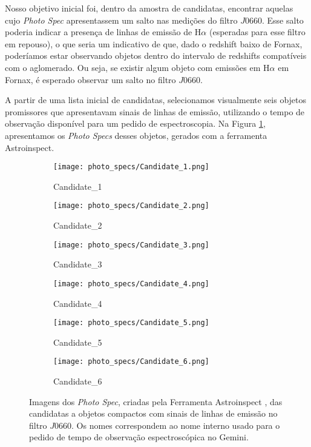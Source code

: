 Nosso objetivo inicial foi, dentro da amostra de candidatas, encontrar aquelas cujo \textit{Photo Spec} apresentassem um salto nas medições do filtro $J0660$. Esse salto poderia indicar a presença de linhas de emissão de H$\alpha$ (esperadas para esse filtro em repouso), o que seria um indicativo de que, dado o redshift baixo de Fornax, poderíamos estar observando objetos dentro do intervalo de redshifts compatíveis com o aglomerado. Ou seja, se existir algum objeto com emissões em H$\alpha$ em Fornax, é esperado observar um salto no filtro $J0660$.

A partir de uma lista inicial de candidatas, selecionamos visualmente seis objetos promissores que apresentavam sinais de linhas de emissão, utilizando o tempo de observação disponível para um pedido de espectroscopia. Na Figura \ref{photo_spec_candidatas}, apresentamos os \textit{Photo Specs} desses objetos, gerados com a ferramenta Astroinspect.

\begin{figure}[!ht]
    \centering
    \captionsetup{justification=centering}
    \begin{subfigure}[b]{0.3\textwidth}
        \texttt{[image: photo\_specs/Candidate\_1.png]}
        \caption{Candidate\_1}
    \end{subfigure}
    \begin{subfigure}[b]{0.3\textwidth}
        \texttt{[image: photo\_specs/Candidate\_2.png]}
        \caption{Candidate\_2}
    \end{subfigure}
    \begin{subfigure}[b]{0.3\textwidth}
        \texttt{[image: photo\_specs/Candidate\_3.png]}
        \caption{Candidate\_3}
    \end{subfigure}
    \begin{subfigure}[b]{0.3\textwidth}
        \texttt{[image: photo\_specs/Candidate\_4.png]}
        \caption{Candidate\_4}
    \end{subfigure}
    \begin{subfigure}[b]{0.3\textwidth}
        \texttt{[image: photo\_specs/Candidate\_5.png]}
        \caption{Candidate\_5}
    \end{subfigure}
    \begin{subfigure}[b]{0.3\textwidth}
        \texttt{[image: photo\_specs/Candidate\_6.png]}
        \caption{Candidate\_6}
    \end{subfigure}
    \caption{Imagens dos \textit{Photo Spec}, criadas pela Ferramenta Astroinspect \cite{astroinspect}, das candidatas a objetos compactos com sinais de linhas de emissão no filtro $J0660$. Os nomes correspondem ao nome interno usado para o pedido de tempo de observação espectroscópica no Gemini.}
    \label{photo_spec_candidatas}
\end{figure}

